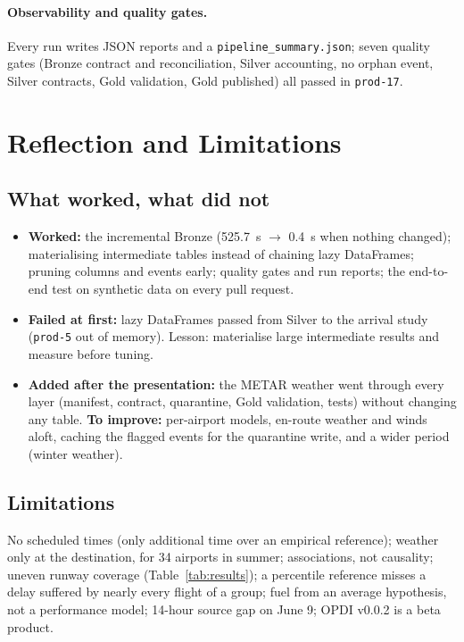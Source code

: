 \documentclass[11pt,a4paper]{article}
\begin{document}
\paragraph{Observability and quality gates.}
Every run writes JSON reports and a \texttt{pipeline\_summary.json}; seven quality gates (Bronze contract and reconciliation, Silver accounting, no orphan event, Silver contracts, Gold validation, Gold published) all passed in \texttt{prod-17}.

\section{Reflection and Limitations}

\subsection{What worked, what did not}
\begin{itemize}[noitemsep,topsep=2pt]
    \item \textbf{Worked:} the incremental Bronze (525.7~s $\rightarrow$ 0.4~s when nothing changed); materialising intermediate tables instead of chaining lazy DataFrames; pruning columns and events early; quality gates and run reports; the end-to-end test on synthetic data on every pull request.
    \item \textbf{Failed at first:} lazy DataFrames passed from Silver to the arrival study (\texttt{prod-5} out of memory). Lesson: materialise large intermediate results and measure before tuning.
    \item \textbf{Added after the presentation:} the METAR weather went through every layer (manifest, contract, quarantine, Gold validation, tests) without changing any table. \textbf{To improve:} per-airport models, en-route weather and winds aloft, caching the flagged events for the quarantine write, and a wider period (winter weather).
\end{itemize}

\subsection{Limitations}
No scheduled times (only additional time over an empirical reference); weather only at the destination, for 34 airports in summer; associations, not causality; uneven runway coverage (Table~\ref{tab:results}); a percentile reference misses a delay suffered by nearly every flight of a group; fuel from an average hypothesis, not a performance model; 14-hour source gap on June 9; OPDI v0.0.2 is a beta product.
\end{document}
